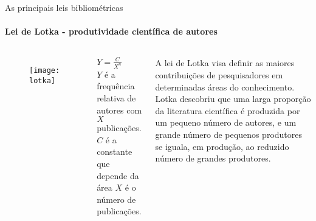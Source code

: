 \begin{frame}[t]{As principais leis bibliométricas}
    \framesubtitle{Lei de Lotka - produtividade científica de autores}
       
          

    \begin{columns}

        \begin{figure}
            \texttt{[image: lotka]}
        \end{figure}

        \centering
        $Y = \frac{C}{X^n}$\\
        $Y$ \scriptsize{é a frequência relativa de autores com $X$ publicações.}\\
        $C$ \scriptsize{é a constante que depende da área $X$ é o número de publicações.}

        A lei de Lotka visa definir as maiores contribuições de pesquisadores em determinadas áreas do conhecimento.\\
            Lotka descobriu que uma larga proporção da literatura científica é produzida por um pequeno número de autores, e um grande número de pequenos produtores se iguala, em produção, ao reduzido número de grandes produtores.
    \end{columns}

    \vspace*{0.2cm}

\end{frame}
